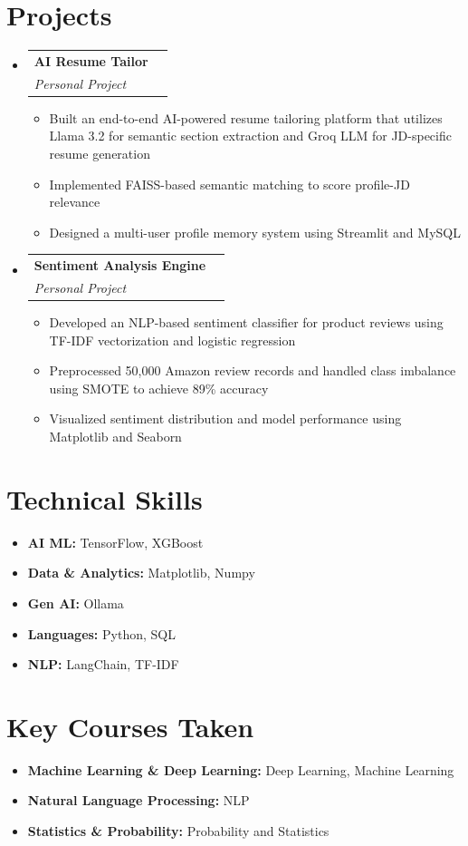 \documentclass[a4paper,11pt]{article}
\makeatletter
\newcommand{\resumeProject}[4]{
\vspace{0.5mm}\item
    \begin{tabular*}{0.98\textwidth}[t]{l@{\extracolsep{\fill}}r}
        \textbf{#1} & \textit{\small #3} \\
        \textit{\small #2} & \small #4 \\
    \end{tabular*}
    \vspace{-2.4mm}
}
\newcommand{\resumeSubHeadingListStart}{\begin{itemize}[leftmargin=*,labelsep=1.5mm]}
\newcommand{\resumeSubHeadingListEnd}{\end{itemize}\vspace{2mm}}
\newcommand{\resumeItemListStart}{
    \begin{justify}
    \begin{itemize}[leftmargin=3ex, rightmargin=2ex, noitemsep, labelsep=1.2mm, itemsep=0mm]
    \small
}
\newcommand{\resumeItemListEnd}{\end{itemize}\end{justify}\vspace{-2mm}}
\newcommand{\resumeHeadingSkillStart}{\begin{itemize}[leftmargin=*,itemsep=1.7mm, rightmargin=2ex]}
\newcommand{\resumeHeadingSkillEnd}{\end{itemize}\vspace{-2mm}}
\makeatother
\begin{document}
\section{Projects}
\resumeSubHeadingListStart
  \resumeProject
    {AI Resume Tailor}
    {Personal Project}
    {}
    {{}}
    \resumeItemListStart
      \item {Built an end-to-end AI-powered resume tailoring platform that utilizes Llama 3.2 for semantic section extraction and Groq LLM for JD-specific resume generation}
      \item {Implemented FAISS-based semantic matching to score profile-JD relevance}
      \item {Designed a multi-user profile memory system using Streamlit and MySQL}
    \resumeItemListEnd
  \resumeProject
    {Sentiment Analysis Engine}
    {Personal Project}
    {}
    {{}}
    \resumeItemListStart
      \item {Developed an NLP-based sentiment classifier for product reviews using TF-IDF vectorization and logistic regression}
      \item {Preprocessed 50,000 Amazon review records and handled class imbalance using SMOTE to achieve 89\% accuracy}
      \item {Visualized sentiment distribution and model performance using Matplotlib and Seaborn}
    \resumeItemListEnd
\resumeSubHeadingListEnd
\vspace{-5.5mm}

\section{Technical Skills}
\resumeHeadingSkillStart
  \item \textbf{AI ML: }TensorFlow, XGBoost
  \item \textbf{Data \& Analytics: }Matplotlib, Numpy
  \item \textbf{Gen AI: }Ollama
  \item \textbf{Languages: }Python, SQL
  \item \textbf{NLP: }LangChain, TF-IDF
\resumeHeadingSkillEnd
\vspace{-1mm}

\section{Key Courses Taken}
\resumeHeadingSkillStart
  \item \textbf{Machine Learning \& Deep Learning: }Deep Learning, Machine Learning
  \item \textbf{Natural Language Processing: }NLP
  \item \textbf{Statistics \& Probability: }Probability and Statistics
\resumeHeadingSkillEnd
\vspace{-1mm}
\end{document}
